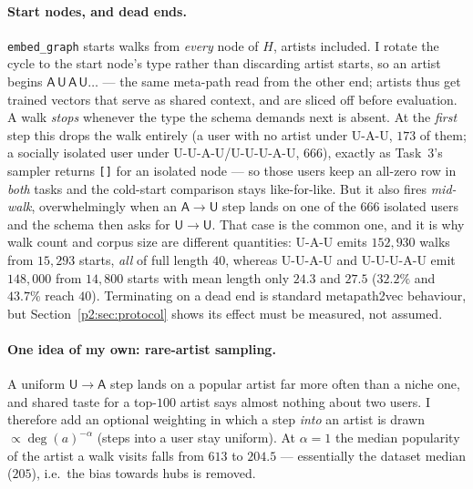 \paragraph{Start nodes, and dead ends.}
\texttt{embed\_graph} starts walks from \emph{every} node of $H$, artists included.  I
rotate the cycle to the start node's type rather than discarding artist starts, so an artist
begins $\mathsf{A\,U\,A\,U}\dots$ --- the same meta-path read from the other end; artists
thus get trained vectors that serve as shared context, and are sliced off before evaluation.
A walk \emph{stops} whenever the type the schema demands next is absent.  At the \emph{first}
step this drops the walk entirely (a user with no artist under \textsf{U-A-U}, $173$ of them;
a socially isolated user under \textsf{U-U-A-U}/\textsf{U-U-U-A-U}, $666$), exactly as
Task~3's sampler returns \texttt{[]} for an isolated node --- so those users keep an all-zero
row in \emph{both} tasks and the cold-start comparison stays like-for-like.  But it also
fires \emph{mid-walk}, overwhelmingly when an $\mathsf{A}\to\mathsf{U}$ step lands on one of
the $666$ isolated users and the schema then asks for $\mathsf{U}\to\mathsf{U}$.  That case
is the common one, and it is why walk count and corpus size are different quantities:
\textsf{U-A-U} emits $152{,}930$ walks from $15{,}293$ starts, \emph{all} of full length
$40$, whereas \textsf{U-U-A-U} and \textsf{U-U-U-A-U} emit $148{,}000$ from $14{,}800$ starts
with mean length only $24.3$ and $27.5$ ($32.2\%$ and $43.7\%$ reach $40$).  Terminating on a
dead end is standard metapath2vec behaviour, but Section~\ref{p2:sec:protocol} shows its
effect must be measured, not assumed.

\paragraph{One idea of my own: rare-artist sampling.}
A uniform $\mathsf{U}\to\mathsf{A}$ step lands on a popular artist far more often than a
niche one, and shared taste for a top-$100$ artist says almost nothing about two users.  I
therefore add an optional weighting in which a step \emph{into} an artist is drawn
$\propto \deg(a)^{-\alpha}$ (steps into a user stay uniform).  At $\alpha{=}1$ the median
popularity of the artist a walk visits falls from $613$ to $204.5$ --- essentially the
dataset median ($205$), i.e.\ the bias towards hubs is removed.


